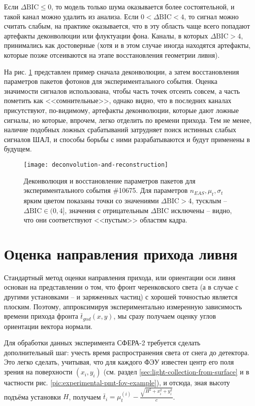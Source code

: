 Если $\Delta \mathrm{BIC} \leq 0$, то модель только шума оказывается более состоятельной, и такой канал можно удалить из анализа. Если $0 < \Delta \mathrm{BIC} < 4$, то сигнал можно считать слабым, на практике оказывается, что в эту область чаще всего попадают артефакты деконволюции или флуктуации фона. Каналы, в которых $\Delta \mathrm{BIC} > 4$, принимались как достоверные (хотя и в этом случае иногда находятся артефакты, которые позже отсеиваются на этапе восстановления геометрии ливня).

На рис. \ref{pic:deconvolution-and-reconstruction} представлен пример сначала деконволюции, а затем восстановления параметров пакетов фотонов для экспериментального события. Оценка значимости сигналов использована, чтобы часть точек отсеить совсем, а часть пометить как <<сомнительные>>, однако видно, что в последних каналах присутствуют, по-видимому, артефакты деконволюции, которые дают ложные сигналы, но которые, впрочем, легко отделить по времени прихода. Тем не менее, наличие подобных ложных срабатываний затрудняет поиск истинных слабых сигналов ШАЛ, и способы борьбы с ними разрабатываются и будут применены в будущем.

\begin{figure}
	\centering
	\texttt{[image: deconvolution-and-reconstruction]}
	\caption{Деконволюция и восстановление параметров пакетов для экспериментального события \#10675. Для параметров $n_{EAS}, \mu_t, \sigma_t$ ярким цветом показаны точки со значениями $\Delta \mathrm{BIC} > 4$, тусклым -- $\Delta \mathrm{BIC} \in (0, 4]$, значения с отрицательным $\Delta \mathrm{BIC}$ исключены -- видно, что они соответствуют <<пустым>> областям кадра.}
	\label{pic:deconvolution-and-reconstruction}
\end{figure}


\section{Оценка направления прихода ливня}

Стандартный метод оценки направления прихода, или ориентации оси ливня основан на представлении о том, что фронт черенковского света (а в случае с другими установками -- и заряженных частиц) с хорошей точностью является плоским. Поэтому, аппроксимируя экспериментально измеренную зависимость времени прихода фронта $\bar{t}_{gnd}(x, y)$, мы сразу получаем оценку углов ориентации вектора нормали.

Для обработки данных эксперимента СФЕРА-2 требуется сделать дополнительный шаг: учесть время распространения света от снега до детектора. Это легко сделать, учитывая, что для каждого ФЭУ известен центр его поля зрения на поверхности $(x_i, y_i)$ (см. раздел \ref{sec:light-collection-from-surface} и в частности рис. \ref{pic:experimental-pmt-fov-example}), и отсюда, зная высоту подъёма установки $H$, получаем $\bar{t}_{i} = \mu_t^{(i)} - \frac{\sqrt{H^2 + x_i^2 + y_i^2}}{c}$.

